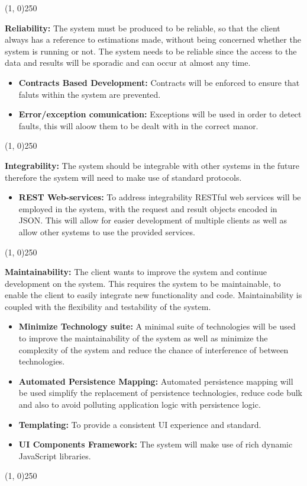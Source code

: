 		\begin{center}
		\line(1, 0){250}
		\end{center}
	{\bfseries Reliability:}
	The system must be produced to be reliable, so that the client always has a reference to estimations made, without being concerned whether the system is running or not. The system needs to be reliable since the access to the data and results will be sporadic and can occur at almost any time.
		\begin{itemize}
			\item{\bfseries Contracts Based Development:}
				Contracts will be enforced to ensure that faluts within the system are prevented.
			\item{\bfseries Error/exception comunication:}
				Exceptions will be used in order to detect faults, this will aloow them to be dealt with in the correct manor.
		\end{itemize}
	\begin{center}
	\line(1, 0){250}
	\end{center}
	{\bfseries Integrability:}
	The system should be integrable with other systems in the future therefore the system will need to make use of standard protocols.
		\begin{itemize}
			\item{\bfseries REST Web-services:}
				To address integrability RESTful web services will be employed in the system, with the request and result objects encoded in JSON. This will allow for easier development of multiple clients as well as allow other systems to use the provided services.
		\end{itemize}
		\begin{center}
		\line(1, 0){250}
		\end{center}
	{\bfseries Maintainability:}
	The client wants to improve the system and continue development on the system. This requires the system to be maintainable, to enable the client to easily integrate new functionality and code. Maintainability is coupled with the flexibility and testability of the system.
		\begin{itemize}
			\item{\bfseries Minimize Technology suite:}
				A minimal suite of technologies will be used to improve the maintainability of the system as well as minimize the complexity of the system and reduce the chance of interference of between technologies.
			\item{\bfseries Automated Persistence Mapping:}
				Automated persistence mapping will be used simplify the replacement of persistence technologies, reduce code bulk and also to avoid polluting application logic with persistence logic.
			\item{\bfseries Templating:}
				To provide a consistent UI experience and standard.
			\item{\bfseries UI Components Framework:}
				The system will make use of rich dynamic JavaScript libraries.
		\end{itemize}
		\begin{center}
		\line(1, 0){250}
		\end{center}
